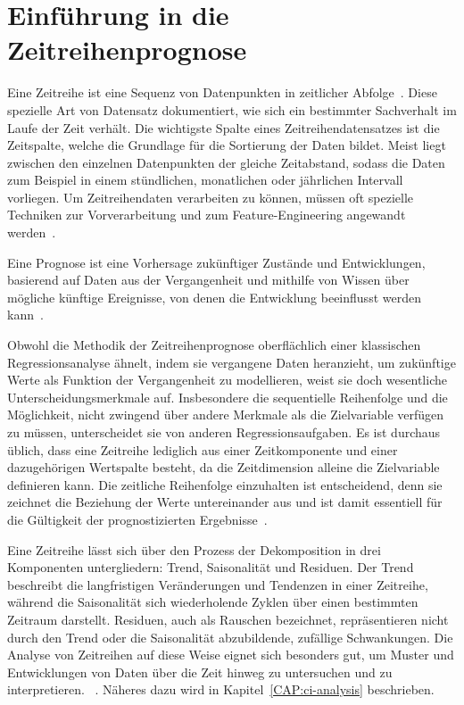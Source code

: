 \section{Einführung in die Zeitreihenprognose}\label{CAP:intor-time-series-forecasting}
Eine Zeitreihe ist eine Sequenz von Datenpunkten in zeitlicher Abfolge~\cite{Peixeiro.2022}.
Diese spezielle Art von Datensatz dokumentiert, wie sich ein bestimmter Sachverhalt im Laufe der Zeit verhält.
Die wichtigste Spalte eines Zeitreihendatensatzes ist die Zeitspalte, welche die Grundlage für die Sortierung der Daten bildet.
Meist liegt zwischen den einzelnen Datenpunkten der gleiche Zeitabstand, sodass die Daten zum Beispiel in einem stündlichen, monatlichen oder jährlichen Intervall vorliegen.
Um Zeitreihendaten verarbeiten zu können, müssen oft spezielle Techniken zur Vorverarbeitung und zum Feature-Engineering angewandt werden~\cite{Lazzeri.2021}.

Eine Prognose ist eine Vorhersage zukünftiger Zustände und Entwicklungen, basierend auf Daten aus der Vergangenheit und mithilfe von Wissen über mögliche künftige Ereignisse, von denen die Entwicklung beeinflusst werden kann~\cite{Peixeiro.2022}.

Obwohl die Methodik der Zeitreihenprognose oberflächlich einer klassischen Regressionsanalyse ähnelt, indem sie vergangene Daten heranzieht, um zukünftige Werte als Funktion der Vergangenheit zu modellieren, weist sie doch wesentliche Unterscheidungsmerkmale auf.
Insbesondere die sequentielle Reihenfolge und die Möglichkeit, nicht zwingend über andere Merkmale als die Zielvariable verfügen zu müssen, unterscheidet sie von anderen Regressionsaufgaben.
Es ist durchaus üblich, dass eine Zeitreihe lediglich aus einer Zeitkomponente und einer dazugehörigen Wertspalte besteht, da die Zeitdimension alleine die Zielvariable definieren kann.
Die zeitliche Reihenfolge einzuhalten ist entscheidend, denn sie zeichnet die Beziehung der Werte untereinander aus und ist damit essentiell für die Gültigkeit der prognostizierten Ergebnisse~\cite{Peixeiro.2022}.

Eine Zeitreihe lässt sich über den Prozess der Dekomposition in drei Komponenten untergliedern:
Trend, Saisonalität und Residuen.
Der Trend beschreibt die langfristigen Veränderungen und Tendenzen in einer Zeitreihe, während die Saisonalität sich wiederholende Zyklen über einen bestimmten Zeitraum darstellt.
Residuen, auch als Rauschen bezeichnet, repräsentieren nicht durch den Trend oder die Saisonalität abzubildende, zufällige Schwankungen.
Die Analyse von Zeitreihen auf diese Weise eignet sich besonders gut, um Muster und Entwicklungen von Daten über die Zeit hinweg zu untersuchen und zu interpretieren. ~\cite{Peixeiro.2022}.
Näheres dazu wird in Kapitel~\ref{CAP:ci-analysis} beschrieben.

